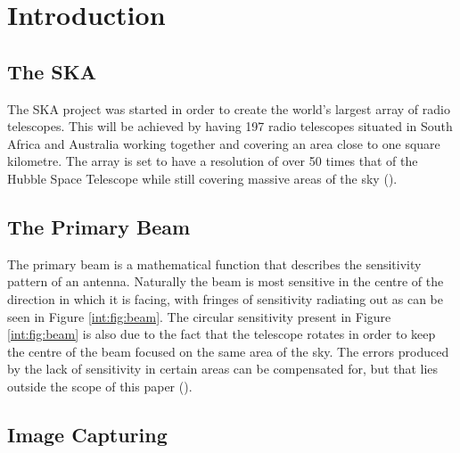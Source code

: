 \section{Introduction}\label{int}
\subsection{The SKA}\label{int:sec:ska}
The SKA project was started in order to create the world's largest array of radio telescopes. This will be achieved by having 197 radio telescopes situated in South Africa and Australia working together and covering an area close to one square kilometre. The array is set to have a resolution of over 50 times that of the Hubble Space Telescope while still covering massive areas of the sky (\cite{SKAsite}).
\subsection{The Primary Beam}\label{int:sec:tpb}
The primary beam is a mathematical function that describes the sensitivity pattern of an antenna. Naturally the beam is most sensitive in the centre of the direction in which it is facing, with fringes of sensitivity radiating out as can be seen in Figure \ref{int:fig:beam}. The circular sensitivity present in Figure \ref{int:fig:beam} is also due to the fact that the telescope rotates in order to keep the centre of the beam focused on the same area of the sky. The errors produced by the lack of sensitivity in certain areas can be compensated for, but that lies outside the scope of this paper (\citet{oleg}).
\subsection{Image Capturing}\label{int:sec:img}
